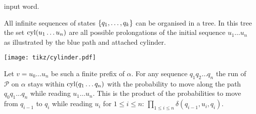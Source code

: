 input word.
\begin{drawing}
  \caption{All infinite sequences of states $\left\{q_{1},\dots, q_{k}\right\}$ can be
  organised in a tree. In this tree the set $\operatorname{cyl}(u_{1}\dots u_{n})$ are all 
  possible prolongations of the initial sequence $u_{1}\dots u_{n}$ as 
  illustrated by the blue path and attached cylinder.}
  \label{fig:cylinder}
  \begin{center}
    \texttt{[image: tikz/cylinder.pdf]}
  \end{center}
\end{drawing}
Let $v = u_{0}\dots u_{n}$ be such a finite prefix of $\alpha$.
For any sequence $q_{1}q_{2}\dots q_{n}$ the run of $\mathcal{P}$
on $\alpha$ stays within $\operatorname{cyl}(q_{1}\dots q_{n})$ with the probability to
move along the path $q_{0}q_{1}\dots q_{n}$ while reading $u_{1}\dots u_{n}$.
This is the product of the probabilities to move from $q_{i-1}$ to $q_{i}$
while reading $u_{i}$ for $1\leq i\leq n$: 
$\prod_{1\leq i\leq n}\delta(q_{i-1},u_{i},q_{i})$. 

